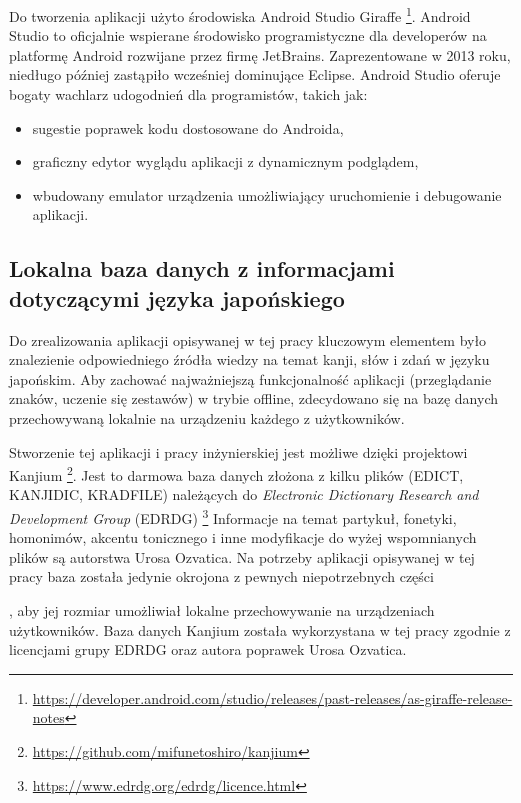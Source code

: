 \documentclass[a4paper,twoside,12pt]{book}
\newcommand{\ksremark}[1]{%
{%
{\color{brickred}{[#1]}}}%
\addcontentsline{rks}{uwagas}{\protect{#1}}%
}
\newcommand{\obcy}[1]{\emph{#1}}
\newcommand{\english}[1]{{\selectlanguage{british}\obcy{#1}}}
\begin{document}
Do tworzenia aplikacji użyto środowiska Android Studio Giraffe \footnote{\url{https://developer.android.com/studio/releases/past-releases/as-giraffe-release-notes}}. Android Studio to oficjalnie wspierane środowisko programistyczne dla developerów na platformę Android rozwijane przez firmę JetBrains. Zaprezentowane w 2013 roku, niedługo później zastąpiło wcześniej dominujące Eclipse. Android Studio oferuje bogaty wachlarz udogodnień dla programistów, takich jak:
\begin{itemize}
\item sugestie poprawek kodu dostosowane do Androida,
\item graficzny edytor wyglądu aplikacji z dynamicznym podglądem,
\item wbudowany emulator urządzenia umożliwiający uruchomienie i debugowanie aplikacji.
\end{itemize}
 
\subsection{Lokalna baza danych z informacjami dotyczącymi języka japońskiego}

Do zrealizowania aplikacji opisywanej w tej pracy kluczowym elementem było znalezienie odpowiedniego źródła wiedzy na temat kanji, słów i zdań w języku japońskim. Aby zachować najważniejszą funkcjonalność aplikacji (przeglądanie znaków, uczenie się zestawów) w trybie offline, zdecydowano się na bazę danych przechowywaną lokalnie na urządzeniu każdego z użytkowników. 

Stworzenie tej aplikacji i pracy inżynierskiej jest możliwe dzięki projektowi Kanjium \footnote{\url{https://github.com/mifunetoshiro/kanjium}}. Jest to darmowa baza danych złożona z kilku plików (EDICT, KANJIDIC, KRADFILE) należących do  \english{Electronic Dictionary Research and Development Group} (EDRDG) \footnote{\url{https://www.edrdg.org/edrdg/licence.html}} Informacje na temat partykuł, fonetyki, homonimów, akcentu tonicznego i inne modyfikacje do wyżej wspomnianych plików są autorstwa Urosa Ozvatica. Na potrzeby aplikacji opisywanej w tej pracy baza została jedynie okrojona z pewnych niepotrzebnych części 
\ksremark{np. czego? todo}
, aby jej rozmiar umożliwiał lokalne przechowywanie na urządzeniach użytkowników. Baza danych Kanjium została wykorzystana w tej pracy zgodnie z licencjami grupy EDRDG oraz autora poprawek Urosa Ozvatica.
\end{document}
